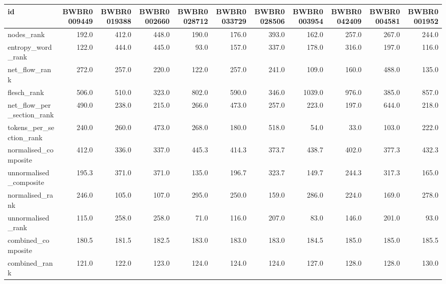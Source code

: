 \begin{tabular}{lrrrrrrrrrr}
\toprule
id & BWBR0009449 & BWBR0019388 & BWBR0002660 & BWBR0028712 & BWBR0033729 & BWBR0028506 & BWBR0003954 & BWBR0042409 & BWBR0004581 & BWBR0001952 \\
\midrule
nodes\_rank & 192.0 & 412.0 & 448.0 & 190.0 & 176.0 & 393.0 & 162.0 & 257.0 & 267.0 & 244.0 \\
\cline{1-11}
entropy\_word\_rank & 122.0 & 444.0 & 445.0 & 93.0 & 157.0 & 337.0 & 178.0 & 316.0 & 197.0 & 116.0 \\
\cline{1-11}
net\_flow\_rank & 272.0 & 257.0 & 220.0 & 122.0 & 257.0 & 241.0 & 109.0 & 160.0 & 488.0 & 135.0 \\
\cline{1-11}
flesch\_rank & 506.0 & 510.0 & 323.0 & 802.0 & 590.0 & 346.0 & 1039.0 & 976.0 & 385.0 & 857.0 \\
\cline{1-11}
net\_flow\_per\_section\_rank & 490.0 & 238.0 & 215.0 & 266.0 & 473.0 & 257.0 & 223.0 & 197.0 & 644.0 & 218.0 \\
\cline{1-11}
tokens\_per\_section\_rank & 240.0 & 260.0 & 473.0 & 268.0 & 180.0 & 518.0 & 54.0 & 33.0 & 103.0 & 222.0 \\
\cline{1-11}
normalised\_composite & 412.0 & 336.0 & 337.0 & 445.3 & 414.3 & 373.7 & 438.7 & 402.0 & 377.3 & 432.3 \\
\cline{1-11}
unnormalised\_composite & 195.3 & 371.0 & 371.0 & 135.0 & 196.7 & 323.7 & 149.7 & 244.3 & 317.3 & 165.0 \\
\cline{1-11}
normalised\_rank & 246.0 & 105.0 & 107.0 & 295.0 & 250.0 & 159.0 & 286.0 & 224.0 & 169.0 & 278.0 \\
\cline{1-11}
unnormalised\_rank & 115.0 & 258.0 & 258.0 & 71.0 & 116.0 & 207.0 & 83.0 & 146.0 & 201.0 & 93.0 \\
\cline{1-11}
combined\_composite & 180.5 & 181.5 & 182.5 & 183.0 & 183.0 & 183.0 & 184.5 & 185.0 & 185.0 & 185.5 \\
\cline{1-11}
combined\_rank & 121.0 & 122.0 & 123.0 & 124.0 & 124.0 & 124.0 & 127.0 & 128.0 & 128.0 & 130.0 \\
\cline{1-11}
\bottomrule
\end{tabular}
